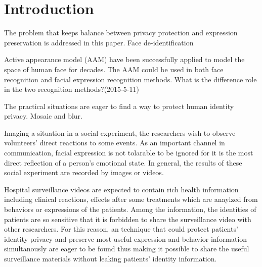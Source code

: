 
\chapter{Introduction}

The problem that keeps balance between privacy protection and expression preservation is addressed in this paper. 
Face de-identification 

\par
Active appearance model (AAM) have been successfully applied to model the space of human face for decades. The AAM could be used in both face recognition and facial expression recognition methods. What is the difference role in the two recognition methods?(2015-5-11)

\par
The practical situations are eager to find a way to protect human identity privacy. Mosaic and blur.

\par
Imaging a situation in a social experiment, the researchers wish to observe volunteers' direct reactions to some events. As an important channel in communication, facial expression is not tolarable to be ignored for it is the most direct reflection of a person's emotional state. In general, the results of these social experiment are recorded by images or videos. 


\par
Hospital surveillance videos are expected to contain rich health information including clinical reactions, effects after some treatments which are anaylzed from behaviors or expressions of the patients. Among the information, the identities of patients are so sensitive that it is forbidden to share the surveillance video with other researchers. For this reason, an technique that could protect patients' identity privacy and preserve most useful expression and behavior information simultanously are eager to be found thus making it possible to share the useful surveillance materials without leaking patients' identity information.

